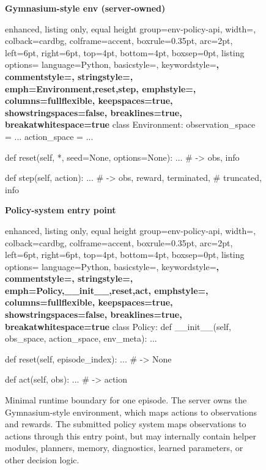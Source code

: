 \begin{figure}[t]
\centering
\begin{minipage}[t]{0.485\linewidth}
\textbf{Gymnasium-style env (server-owned)}
\begin{tcblisting}{
  enhanced,
  listing only,
  equal height group=env-policy-api,
  width=\linewidth,
  colback=cardbg,
  colframe=accent,
  boxrule=0.35pt,
  arc=2pt,
  left=6pt,
  right=6pt,
  top=4pt,
  bottom=4pt,
  boxsep=0pt,
  listing options={
    language=Python,
    basicstyle=\ttfamily\scriptsize,
    keywordstyle=\color{accent}\bfseries,
    commentstyle=\color{black!55},
    stringstyle=\color{black!70},
    emph={Environment,reset,step},
    emphstyle=\color{accent}\bfseries,
    columns=fullflexible,
    keepspaces=true,
    showstringspaces=false,
    breaklines=true,
    breakatwhitespace=true
  }
}
class Environment:
    observation_space = ...
    action_space = ...

    def reset(self, *, seed=None,
              options=None): ...
    # -> obs, info

    def step(self, action): ...
    # -> obs, reward, terminated,
    #    truncated, info
\end{tcblisting}
\end{minipage}
\hfill
\begin{minipage}[t]{0.485\linewidth}
\textbf{Policy-system entry point}
\begin{tcblisting}{
  enhanced,
  listing only,
  equal height group=env-policy-api,
  width=\linewidth,
  colback=cardbg,
  colframe=accent,
  boxrule=0.35pt,
  arc=2pt,
  left=6pt,
  right=6pt,
  top=4pt,
  bottom=4pt,
  boxsep=0pt,
  listing options={
    language=Python,
    basicstyle=\ttfamily\scriptsize,
    keywordstyle=\color{accent}\bfseries,
    commentstyle=\color{black!55},
    stringstyle=\color{black!70},
    emph={Policy,__init__,reset,act},
    emphstyle=\color{accent}\bfseries,
    columns=fullflexible,
    keepspaces=true,
    showstringspaces=false,
    breaklines=true,
    breakatwhitespace=true
  }
}
class Policy:
    def __init__(self, obs_space,
                 action_space, env_meta): ...

    def reset(self, episode_index): ...
    # -> None

    def act(self, obs): ...
    # -> action


    
\end{tcblisting}
\end{minipage}
\caption{Minimal runtime boundary for one \evopolicygym{} episode. The server
owns the Gymnasium-style environment, which maps actions to observations and
rewards. The submitted policy system maps observations to actions through this
entry point, but may internally contain helper modules, planners, memory,
diagnostics, learned parameters, or other decision logic.}
\label{fig:environment-policy-api}
\end{figure}

